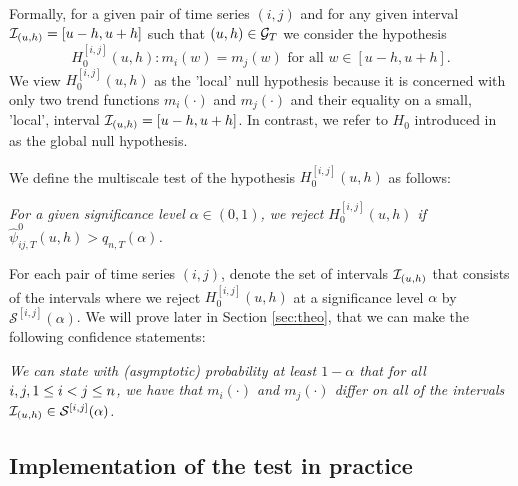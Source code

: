 \documentclass[a4paper,12pt]{article}
\makeatletter
\renewcommand{\eqref}[1]{\tagform@{\ref{#1}}}
\makeatother
\begin{document}
Formally, for a given pair of time series $(i, j)$ and for any given interval \linebreak $\mathcal{I}_{(u, h)} = [u-h, u+h]$ such that $(u, h) \in \mathcal{G}_T$ we consider the hypothesis 
\[ H_0^{[i,j]}(u,h): m_i(w) = m_j(w) \text{ for all } w \in [u-h,u+h]. \] 
We view $H_0^{[i,j]}(u,h)$ as the 'local' null hypothesis because it is concerned with only two trend functions $m_i(\cdot)$ and $m_j(\cdot)$ and their equality on a small, 'local', interval $\mathcal{I}_{(u, h)} = [u-h, u+h]$. In contrast, we refer to $H_0$ introduced in \eqref{eq:null} as the global null hypothesis.

We define the multiscale test of the hypothesis $H_0^{[i,j]}(u,h)$ as follows: 
\begin{center}
\begin{minipage}[c][1.25cm][c]{13cm}
\textit{For a given significance level $\alpha \in (0,1)$, we reject $H_0^{[i,j]}(u,h)$ if \linebreak $\hat{\psi}^0_{ij,T}(u, h) > q_{n,T}(\alpha)$.}
\end{minipage}
\end{center}

For each pair of time series $(i, j)$, denote the set of intervals $\mathcal{I}_{(u, h)}$ that consists of the intervals where we reject $H_0^{[i,j]}(u,h)$ at a significance level $\alpha$ by $\mathcal{S}^{[i, j]}(\alpha)$. We will prove later in Section \ref{sec:theo}, that we can make the following confidence statements:

\begin{center}
\begin{minipage}[c][1.25cm][c]{13cm}
\textit{We can state with (asymptotic) probability at least $1-\alpha$ that for all $i, j, \linebreak1\leq i < j \leq n$, we have that $m_i(\cdot)$ and $m_j(\cdot)$ differ on all of the intervals $\mathcal{I}_{(u, h)} \in \mathcal{S}^{[i, j]}(\alpha)$.}
\end{minipage}
\end{center}


\subsection{Implementation of the test in practice}\label{subsec:test:impl}
\end{document}
